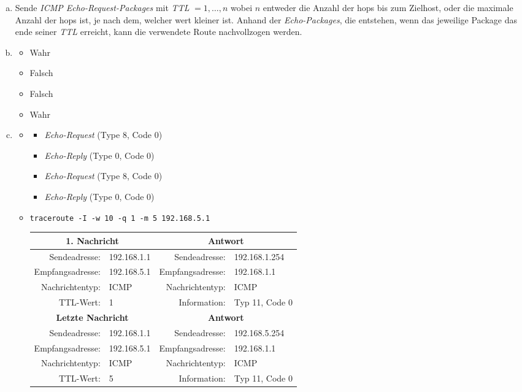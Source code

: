 \begin{enumerate}[a)]
	\item Sende \textit{ICMP Echo-Request-Packages} mit \textit{TTL} $= 1,\dots,n$ wobei $n$ entweder die Anzahl der hops bis zum Zielhost, oder die maximale Anzahl der hops ist, je nach dem, welcher wert kleiner ist. Anhand der \textit{Echo-Packages}, die entstehen, wenn das jeweilige Package das ende seiner \textit{TTL} erreicht, kann die verwendete Route nachvollzogen werden.

	\item \begin{itemize}
		\item Wahr
		\item Falsch
		\item Falsch
		\item Wahr
	\end{itemize}
	
	\item \begin{itemize}
		\item \begin{itemize}
			\item \textit{Echo-Request} (Type 8, Code 0)
			\item \textit{Echo-Reply} (Type 0, Code 0)
			\item \textit{Echo-Request} (Type 8, Code 0)
			\item \textit{Echo-Reply} (Type 0, Code 0)
		\end{itemize}
		\item \texttt{traceroute -I -w 10 -q 1 -m 5 192.168.5.1}
		
		\begin{tabular}{|r|l|r|l|}
			\hline
			\multicolumn{2}{|c|}{\textbf{1. Nachricht}} & \multicolumn{2}{c|}{\textbf{Antwort}} \\ \hline
			Sendeadresse:    & 192.168.1.1 & Sendeadresse:    & 192.168.1.254 \\ \hline
			Empfangsadresse: & 192.168.5.1 & Empfangsadresse: & 192.168.1.1 \\ \hline
			Nachrichtentyp:  & ICMP        & Nachrichtentyp:  & ICMP \\ \hline
			TTL-Wert:        & 1           & Information:     & Typ 11, Code 0 \\ 
			\hline \hline
			\multicolumn{2}{|c|}{\textbf{Letzte Nachricht}} & \multicolumn{2}{c|}{\textbf{Antwort}} \\ \hline
			Sendeadresse:    & 192.168.1.1 & Sendeadresse:    & 192.168.5.254 \\ \hline
			Empfangsadresse: & 192.168.5.1 & Empfangsadresse: & 192.168.1.1 \\ \hline
			Nachrichtentyp:  & ICMP        & Nachrichtentyp:  & ICMP \\ \hline
			TTL-Wert:        & 5           & Information:     & Typ 11, Code 0 \\ \hline
			 
		\end{tabular}
	\end{itemize}
\end{enumerate}




